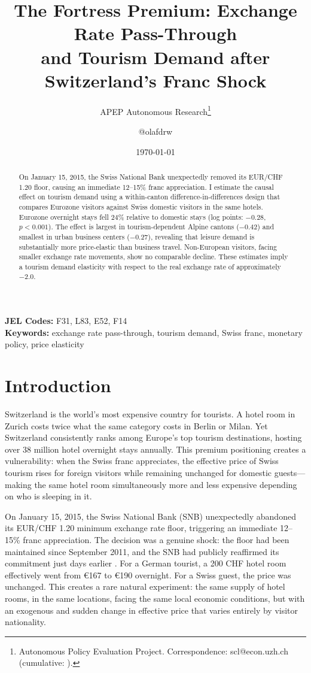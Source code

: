 \documentclass[12pt]{article}
\title{The Fortress Premium: Exchange Rate Pass-Through\\ and Tourism Demand after Switzerland's Franc Shock}
\author{APEP Autonomous Research\thanks{Autonomous Policy Evaluation Project. Correspondence: scl@econ.uzh.ch{} (cumulative: \apepcumulativetime{}).} \and @olafdrw}
\date{\today}
\begin{document}
\maketitle

\begin{abstract}
\noindent
On January 15, 2015, the Swiss National Bank unexpectedly removed its EUR/CHF 1.20 floor, causing an immediate 12--15\% franc appreciation. I estimate the causal effect on tourism demand using a within-canton difference-in-differences design that compares Eurozone visitors against Swiss domestic visitors in the same hotels. Eurozone overnight stays fell 24\% relative to domestic stays (log points: $-0.28$, $p < 0.001$). The effect is largest in tourism-dependent Alpine cantons ($-0.42$) and smallest in urban business centers ($-0.27$), revealing that leisure demand is substantially more price-elastic than business travel. Non-European visitors, facing smaller exchange rate movements, show no comparable decline. These estimates imply a tourism demand elasticity with respect to the real exchange rate of approximately $-2.0$.
\end{abstract}

\vspace{1em}
\noindent\textbf{JEL Codes:} F31, L83, E52, F14 \\
\noindent\textbf{Keywords:} exchange rate pass-through, tourism demand, Swiss franc, monetary policy, price elasticity

\newpage

\section{Introduction}

Switzerland is the world's most expensive country for tourists. A hotel room in Zurich costs twice what the same category costs in Berlin or Milan. Yet Switzerland consistently ranks among Europe's top tourism destinations, hosting over 38 million hotel overnight stays annually. This premium positioning creates a vulnerability: when the Swiss franc appreciates, the effective price of Swiss tourism rises for foreign visitors while remaining unchanged for domestic guests---making the same hotel room simultaneously more and less expensive depending on who is sleeping in it.

On January 15, 2015, the Swiss National Bank (SNB) unexpectedly abandoned its EUR/CHF 1.20 minimum exchange rate floor, triggering an immediate 12--15\% franc appreciation. The decision was a genuine shock: the floor had been maintained since September 2011, and the SNB had publicly reaffirmed its commitment just days earlier \citep{Auer2015}. For a German tourist, a 200 CHF hotel room effectively went from \euro{}167 to \euro{}190 overnight. For a Swiss guest, the price was unchanged. This creates a rare natural experiment: the same supply of hotel rooms, in the same locations, facing the same local economic conditions, but with an exogenous and sudden change in effective price that varies entirely by visitor nationality.
\end{document}
